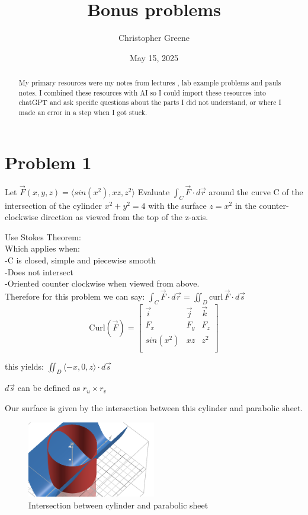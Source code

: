 \documentclass[12pt]{amsart}
\title{Bonus problems}
\author{Christopher Greene}
\date{May 15, 2025}
\newcommand{\lineint}[1]{\int_C \vec{#1} \cdot d\vec{r}}
\newcommand{\surfint}[1]{\iint_D {#1} \cdot d\vec{s}}
\newcommand{\vectr}[3]{\langle {#1} , {#2} , {#3} \rangle}
\begin{document}
\maketitle

\begin{abstract}
    My primary resources were my notes from lectures , lab example problems and pauls notes. I combined these resources with AI so I could import these 
    resources into chatGPT and ask specific questions about the parts I did not understand, or where I made an error in a step when I got stuck.
\end{abstract}

\section{Problem 1}

Let $ \vec{F}(x,y,z) = \langle sin(x^2) , xz , z^2 \rangle $
Evaluate $\lineint{F}$ around the curve C of the intersection of the cylinder $ x^2 + y^2 = 4$ with 
the surface $z = x^2$ in the counter-clockwise direction as viewed from the top of the z-axis.

Use Stokes Theorem: \\
Which applies when: \\
-C is closed, simple and piecewise smooth \\
-Does not intersect \\
-Oriented counter clockwise when viewed from above. \\

Therefore for this problem we can say:
$\lineint{F} = \surfint{\mathrm{curl}\,\vec{F}}$ 
\[
\mathrm{Curl}(\vec{F}) = \begin{bmatrix}
    \vec{i} & \vec{j} & \vec{k} \\
    F_x     &  F_y    &  F_z    \\
    sin(x^2)&  xz     &  z^2    \\
\end{bmatrix}
\]

this yields:
$\surfint{\vectr{-x}{0}{z}}$

$d\vec{s}$ can be defined as $r_u \times r_v$ 

Our surface is given by the intersection between this cylinder and parabolic sheet.

\begin{figure}[H]
\includegraphics[width=0.5\textwidth]{Figure1.png}  
\caption{Intersection between cylinder and parabolic sheet}
\label{figure1}  
\end{figure}
\end{document}
